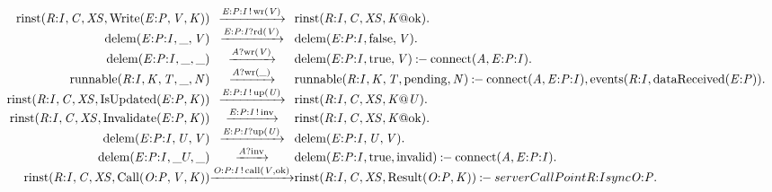 \[\begin{array}{r@{}c@{}l}
\\\Pfact{\Tstep{\Trinst{\Tr{\Tvar{R}}{\Tvar{I}}}{\Tvar{C}}{\Tvar{XS}}{\TrteWrite{\Te{\Tvar{E}}{\Tvar{P}}}{\Tvar{V}}{\Tvar{K}}}}{\Tsay{\Tep{\Tvar{E}}{\Tvar{P}}{\Tvar{I}}}{\Twr{\Tvar{V}}}}{\Trinst{\Tr{\Tvar{R}}{\Tvar{I}}}{\Tvar{C}}{\Tvar{XS}}{\Tap{\Tvar{K}}{\Tatom{ok}}}}}.
\\\Pfact{\Tstep{\Tdelem{\Tep{\Tvar{E}}{\Tvar{P}}{\Tvar{I}}}{\_}{\Tvar{V}}}{\Thear{\Tep{\Tvar{E}}{\Tvar{P}}{\Tvar{I}}}{\Trd{\Tvar{V}}}}{\Tdelem{\Tep{\Tvar{E}}{\Tvar{P}}{\Tvar{I}}}{\Tatom{false}}{\Tvar{V}}}}.
\\\Prule{\Tstep{\Tdelem{\Tep{\Tvar{E}}{\Tvar{P}}{\Tvar{I}}}{\_}{\_}}{\Thear{\Tvar{A}}{\Twr{\Tvar{V}}}}{\Tdelem{\Tep{\Tvar{E}}{\Tvar{P}}{\Tvar{I}}}{\Tatom{true}}{\Tvar{V}}}}{\Tconnect{\Tvar{A}}{\Tep{\Tvar{E}}{\Tvar{P}}{\Tvar{I}}}}.
\\\Prule{\Tstep{\Trunnable{\Tr{\Tvar{R}}{\Tvar{I}}}{\Tvar{K}}{\Tvar{T}}{\_}{\Tvar{N}}}{\Thear{\Tvar{A}}{\Twr{\_}}}{\Trunnable{\Tr{\Tvar{R}}{\Tvar{I}}}{\Tvar{K}}{\Tvar{T}}{\Tatom{pending}}{\Tvar{N}}}}{\Tconnect{\Tvar{A}}{\Tep{\Tvar{E}}{\Tvar{P}}{\Tvar{I}}},\Tevents{\Tr{\Tvar{R}}{\Tvar{I}}}{\TdataReceived{\Te{\Tvar{E}}{\Tvar{P}}}}}.
\\\Pfact{\Tstep{\Trinst{\Tr{\Tvar{R}}{\Tvar{I}}}{\Tvar{C}}{\Tvar{XS}}{\TrteIsUpdated{\Te{\Tvar{E}}{\Tvar{P}}}{\Tvar{K}}}}{\Tsay{\Tep{\Tvar{E}}{\Tvar{P}}{\Tvar{I}}}{\Tup{\Tvar{U}}}}{\Trinst{\Tr{\Tvar{R}}{\Tvar{I}}}{\Tvar{C}}{\Tvar{XS}}{\Tap{\Tvar{K}}{\Tvar{U}}}}}.
\\\Pfact{\Tstep{\Trinst{\Tr{\Tvar{R}}{\Tvar{I}}}{\Tvar{C}}{\Tvar{XS}}{\TrteInvalidate{\Te{\Tvar{E}}{\Tvar{P}}}{\Tvar{K}}}}{\Tsay{\Tep{\Tvar{E}}{\Tvar{P}}{\Tvar{I}}}{\Tatom{inv}}}{\Trinst{\Tr{\Tvar{R}}{\Tvar{I}}}{\Tvar{C}}{\Tvar{XS}}{\Tap{\Tvar{K}}{\Tatom{ok}}}}}.
\\\Pfact{\Tstep{\Tdelem{\Tep{\Tvar{E}}{\Tvar{P}}{\Tvar{I}}}{\Tvar{U}}{\Tvar{V}}}{\Thear{\Tep{\Tvar{E}}{\Tvar{P}}{\Tvar{I}}}{\Tup{\Tvar{U}}}}{\Tdelem{\Tep{\Tvar{E}}{\Tvar{P}}{\Tvar{I}}}{\Tvar{U}}{\Tvar{V}}}}.
\\\Prule{\Tstep{\Tdelem{\Tep{\Tvar{E}}{\Tvar{P}}{\Tvar{I}}}{\_U}{\_}}{\Thear{\Tvar{A}}{\Tatom{inv}}}{\Tdelem{\Tep{\Tvar{E}}{\Tvar{P}}{\Tvar{I}}}{\Tatom{true}}{\Tatom{invalid}}}}{\Tconnect{\Tvar{A}}{\Tep{\Tvar{E}}{\Tvar{P}}{\Tvar{I}}}}.
\\\Prule{\Tstep{\Trinst{\Tr{\Tvar{R}}{\Tvar{I}}}{\Tvar{C}}{\Tvar{XS}}{\TrteCall{\To{\Tvar{O}}{\Tvar{P}}}{\Tvar{V}}{\Tvar{K}}}}{\Tsay{\Top{\Tvar{O}}{\Tvar{P}}{\Tvar{I}}}{\Tcall{\Tvar{V}}{\Tatom{ok}}}}{\Trinst{\Tr{\Tvar{R}}{\Tvar{I}}}{\Tvar{C}}{\Tvar{XS}}{\TrteResult{\To{\Tvar{O}}{\Tvar{P}}}{\Tvar{K}}}}}{\TserverCallPoint{\Tr{\Tvar{R}}{\Tvar{I}}}{\Tsync{\To{\Tvar{O}}{\Tvar{P}}}}}.

\end{array}\]
